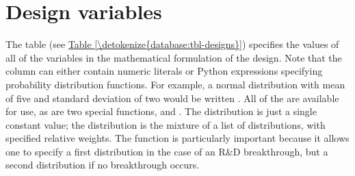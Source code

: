 \documentclass[letterpaper,10pt,english]{sphinxmanual}
\begin{document}
\section{Design variables}
\label{\detokenize{database:design-variables}}
The  table (see \hyperref[\detokenize{database:tbl-designs}]{Table \ref{\detokenize{database:tbl-designs}}}) specifies the values of all of
the variables in the mathematical formulation of the design. Note that
the  column can either contain numeric literals or Python
expressions specifying probability distribution functions. For example,
a normal distribution with mean of five and standard deviation of two
would be written . All of the 
are available for use, as are two special functions,  and
. The  distribution is just a single constant
value; the  distribution is the mixture of a list of
distributions, with specified relative weights. The  function
is particularly important because it allows one to specify a first
distribution in the case of an R\&D breakthrough, but a second
distribution if no breakthrough occurs.
\end{document}

